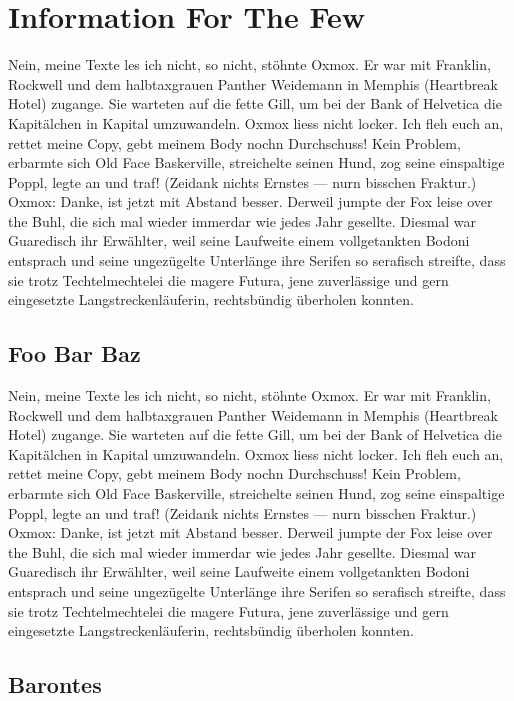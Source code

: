 \chapter{Information For The Few}

Nein, meine Texte les ich nicht, so nicht, stöhnte Oxmox. Er war mit Franklin, Rockwell und dem halbtaxgrauen Panther Weidemann in Memphis (Heartbreak Hotel) zugange. Sie warteten auf die fette Gill, um bei der Bank of Helvetica die Kapitälchen in Kapital umzuwandeln. Oxmox liess nicht locker. Ich fleh euch an, rettet meine Copy, gebt meinem Body nochn Durchschuss! Kein Problem, erbarmte sich Old Face Baskerville, streichelte seinen Hund, zog seine einspaltige Poppl, legte an und traf! (Zeidank nichts Ernstes --- nurn bisschen Fraktur.) Oxmox: Danke, ist jetzt mit Abstand besser. Derweil jumpte der Fox leise over the Buhl, die sich mal wieder immerdar wie jedes Jahr gesellte. Diesmal war Guaredisch ihr Erwählter, weil seine Laufweite einem vollgetankten Bodoni entsprach und seine ungezügelte Unterlänge ihre Serifen so serafisch streifte, dass sie trotz Techtelmechtelei die magere Futura, jene zuverlässige und gern eingesetzte Langstreckenläuferin, rechtsbündig überholen konnten.

\section{Foo Bar Baz}

Nein, meine Texte les ich nicht, so nicht, stöhnte Oxmox. Er war mit Franklin, Rockwell und dem halbtaxgrauen Panther Weidemann in Memphis (Heartbreak Hotel) zugange. Sie warteten auf die fette Gill, um bei der Bank of Helvetica die Kapitälchen in Kapital umzuwandeln. Oxmox liess nicht locker. Ich fleh euch an, rettet meine Copy, gebt meinem Body nochn Durchschuss! Kein Problem, erbarmte sich Old Face Baskerville, streichelte seinen Hund, zog seine einspaltige Poppl, legte an und traf! (Zeidank nichts Ernstes --- nurn bisschen Fraktur.) Oxmox: Danke, ist jetzt mit Abstand besser. Derweil jumpte der Fox leise over the Buhl, die sich mal wieder immerdar wie jedes Jahr gesellte. Diesmal war Guaredisch ihr Erwählter, weil seine Laufweite einem vollgetankten Bodoni entsprach und seine ungezügelte Unterlänge ihre Serifen so serafisch streifte, dass sie trotz Techtelmechtelei die magere Futura, jene zuverlässige und gern eingesetzte Langstreckenläuferin, rechtsbündig überholen konnten.

\section{Barontes}

